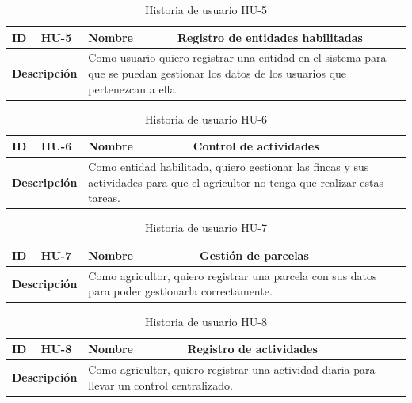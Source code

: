 \begin{table}[H]
    \centering
    \begin{tabular}{|p{2cm}|p{4cm}|p{2cm}|p{4cm}|}
        \hline
        \textbf{ID} & HU-5 & \textbf{Nombre} & Registro de entidades habilitadas \\
        \hline
        \multicolumn{2}{|p{6cm}|}{\textbf{Descripción}} & \multicolumn{2}{p{6cm}|}{Como usuario quiero registrar una entidad en el sistema para que se puedan gestionar los datos de los usuarios que pertenezcan a ella.} \\
        \hline
    \end{tabular}
    \caption{Historia de usuario HU-5}
    \label{tab:hu_5}
\end{table}

\begin{table}[H]
    \centering
    \begin{tabular}{|p{2cm}|p{4cm}|p{2cm}|p{4cm}|}
        \hline
        \textbf{ID} & HU-6 & \textbf{Nombre} & Control de actividades \\
        \hline
        \multicolumn{2}{|p{6cm}|}{\textbf{Descripción}} & \multicolumn{2}{p{6cm}|}{Como entidad habilitada, quiero gestionar las fincas y sus actividades para que el agricultor no tenga que realizar estas tareas.} \\
        \hline
    \end{tabular}
    \caption{Historia de usuario HU-6}
    \label{tab:hu_6}
\end{table}

\begin{table}[H]
    \centering
    \begin{tabular}{|p{2cm}|p{4cm}|p{2cm}|p{4cm}|}
        \hline
        \textbf{ID} & HU-7 & \textbf{Nombre} & Gestión de parcelas \\
        \hline
        \multicolumn{2}{|p{6cm}|}{\textbf{Descripción}} & \multicolumn{2}{p{6cm}|}{Como agricultor, quiero registrar una parcela con sus datos para poder gestionarla correctamente.} \\
        \hline
    \end{tabular}
    \caption{Historia de usuario HU-7}
    \label{tab:hu_7}
\end{table}

\begin{table}[H]
    \centering
    \begin{tabular}{|p{2cm}|p{4cm}|p{2cm}|p{4cm}|}
        \hline
        \textbf{ID} & HU-8 & \textbf{Nombre} & Registro de actividades \\
        \hline
        \multicolumn{2}{|p{6cm}|}{\textbf{Descripción}} & \multicolumn{2}{p{6cm}|}{Como agricultor, quiero registrar una actividad diaria para llevar un control centralizado.} \\
        \hline
    \end{tabular}
    \caption{Historia de usuario HU-8}
    \label{tab:hu_8}
\end{table}

